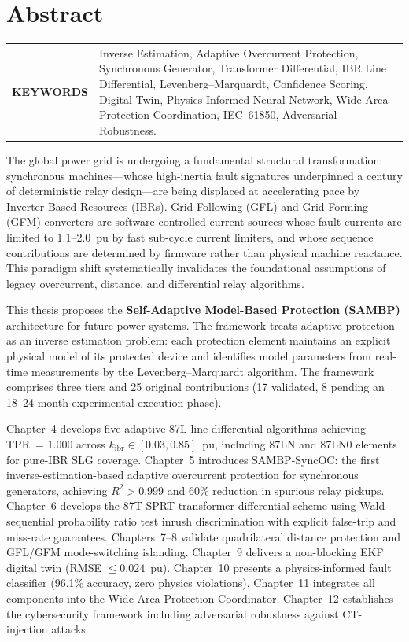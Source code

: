 \chapter{Abstract}

\begin{tabular}{@{} >{\bfseries}p{} p{} @{}}
\MakeUppercase{Keywords} &
Inverse Estimation, Adaptive Overcurrent Protection, Synchronous Generator,
Transformer Differential, IBR Line Differential, Levenberg--Marquardt,
Confidence Scoring, Digital Twin, Physics-Informed Neural Network,
Wide-Area Protection Coordination, IEC~61850, Adversarial Robustness.
\end{tabular}
\par

\begin{doublespacing}

The global power grid is undergoing a fundamental structural transformation:
synchronous machines---whose high-inertia fault signatures underpinned a century
of deterministic relay design---are being displaced at accelerating pace by
Inverter-Based Resources (IBRs). Grid-Following (GFL) and Grid-Forming (GFM)
converters are software-controlled current sources whose fault currents are
limited to 1.1--2.0~pu by fast sub-cycle current limiters, and whose sequence
contributions are determined by firmware rather than physical machine reactance.
This paradigm shift systematically invalidates the foundational assumptions of
legacy overcurrent, distance, and differential relay algorithms.

This thesis proposes the \textbf{Self-Adaptive Model-Based Protection (SAMBP)}
architecture for future power systems. The framework treats adaptive protection
as an inverse estimation problem: each protection element maintains an explicit
physical model of its protected device and identifies model parameters from
real-time measurements by the Levenberg--Marquardt algorithm. The framework
comprises three tiers and 25 original contributions (17 validated, 8 pending
an 18--24 month experimental execution phase).

Chapter~4 develops five adaptive 87L line differential algorithms achieving
TPR~= 1.000 across $k_\mathrm{ibr} \in [0.03, 0.85]$~pu, including 87LN and
87LN0 elements for pure-IBR SLG coverage. Chapter~5 introduces SAMBP-SyncOC:
the first inverse-estimation-based adaptive overcurrent protection for
synchronous generators, achieving $R^2 > 0.999$ and 60\% reduction in
spurious relay pickups. Chapter~6 develops the 87T-SPRT transformer
differential scheme using Wald sequential probability ratio test inrush
discrimination with explicit false-trip and miss-rate guarantees.
Chapters~7--8 validate quadrilateral distance protection and GFL/GFM
mode-switching islanding. Chapter~9 delivers a non-blocking EKF digital twin
(RMSE $\leq 0.024$~pu). Chapter~10 presents a physics-informed fault
classifier (96.1\% accuracy, zero physics violations). Chapter~11 integrates
all components into the Wide-Area Protection Coordinator. Chapter~12 establishes
the cybersecurity framework including adversarial robustness against CT-injection
attacks.


\end{doublespacing}
